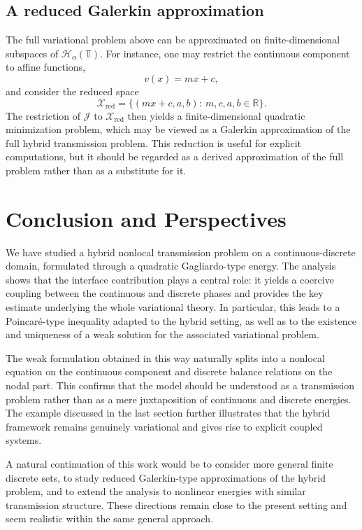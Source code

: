 \documentclass[11pt]{article}
\numberwithin{equation}{section}
\theoremstyle{definition}
\begin{document}
\subsection{A reduced Galerkin approximation}

The full variational problem above can be approximated on finite-dimensional subspaces of $\mathcal H_\alpha(\mathbb T)$. For instance, one may restrict the continuous component to affine functions,
\[
v(x)=mx+c,
\]
and consider the reduced space
\[
\mathcal X_{\mathrm{red}}
=
\{(mx+c,a,b):\ m,c,a,b\in\mathbb R\}.
\]
The restriction of $\mathcal J$ to $\mathcal X_{\mathrm{red}}$ then yields a finite-dimensional quadratic minimization problem, which may be viewed as a Galerkin approximation of the full hybrid transmission problem. This reduction is useful for explicit computations, but it should be regarded as a derived approximation of the full problem rather than as a substitute for it.
\section{Conclusion and Perspectives}

We have studied a hybrid nonlocal transmission problem on a continuous-discrete domain, formulated through a quadratic Gagliardo-type energy. The analysis shows that the interface contribution plays a central role: it yields a coercive coupling between the continuous and discrete phases and provides the key estimate underlying the whole variational theory. In particular, this leads to a Poincar\'e-type inequality adapted to the hybrid setting, as well as to the existence and uniqueness of a weak solution for the associated variational problem.

The weak formulation obtained in this way naturally splits into a nonlocal equation on the continuous component and discrete balance relations on the nodal part. This confirms that the model should be understood as a transmission problem rather than as a mere juxtaposition of continuous and discrete energies. The example discussed in the last section further illustrates that the hybrid framework remains genuinely variational and gives rise to explicit coupled systems.

A natural continuation of this work would be to consider more general finite discrete sets, to study reduced Galerkin-type approximations of the hybrid problem, and to extend the analysis to nonlinear energies with similar transmission structure. These directions remain close to the present setting and seem realistic within the same general approach.
\end{document}
